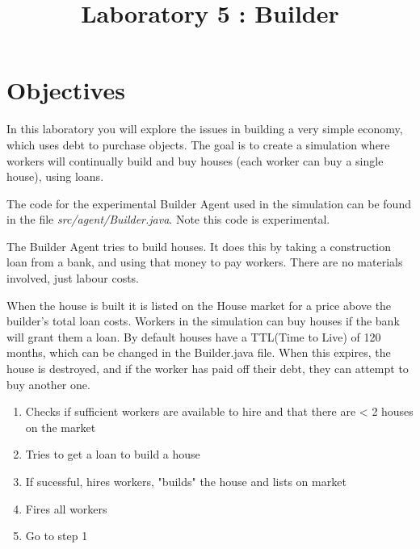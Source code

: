 \documentclass{article}
\title{Laboratory 5 : Builder}
\begin{document}
\maketitle %



\section*{\centering Objectives}
In this laboratory you will explore the issues in building a very
simple economy, which uses debt to purchase objects. The goal
is to create a simulation where workers will continually build
and buy houses (each worker can buy a single house), using
loans.

The code for the experimental Builder Agent used in the simulation can be 
found in the file \emph{src/agent/Builder.java}. Note this code is
experimental.

The Builder Agent tries to build houses. It does this by taking a
construction loan
from a bank, and using that money to pay workers. There
are no materials involved, just labour costs. 

When the house is built it is listed on the House market for a price
above the builder's total loan costs. Workers in the simulation
can buy houses if the bank will grant them a loan. By default houses have
a TTL(Time to Live) of 120 months, which can be changed in the Builder.java
file. When this expires, the house is destroyed, and if the worker has
paid off their debt, they can attempt to buy another one.


\begin{enumerate}
\item Checks if sufficient workers are available to hire and that there are < 2 houses on the market
\item Tries to get a loan to build a house
\item If sucessful, hires workers, "builds" the house and lists on market
\item Fires all workers
\item Go to step 1
\end{enumerate}
\end{document}
